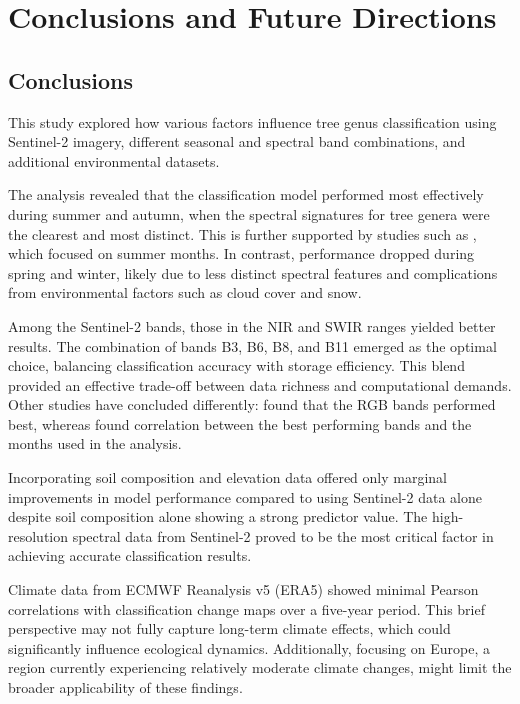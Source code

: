 \chapter{Conclusions and Future Directions}
\label{chapter:conclusion}
\section{Conclusions}


This study explored how various factors influence tree genus classification using Sentinel-2 imagery, different seasonal and spectral band combinations, and additional environmental datasets.

The analysis revealed that the classification model performed most effectively during summer and autumn, when the spectral signatures for tree genera were the clearest and most distinct. This is further supported by studies such as \cite{belgium_classification}, which focused on summer months. In contrast, performance dropped during spring and winter, likely due to less distinct spectral features and complications from environmental factors such as cloud cover and snow.

Among the Sentinel-2 bands, those in the NIR and SWIR ranges yielded better results. The combination of bands B3, B6, B8, and B11 emerged as the optimal choice, balancing classification accuracy with storage efficiency. This blend provided an effective trade-off between data richness and computational demands. Other studies have concluded differently: \cite{Qingyuan} found that the RGB bands performed best, whereas \cite{Yanbiao2021} found correlation between the best performing bands and the months used in the analysis.

Incorporating soil composition and elevation data offered only marginal improvements in model performance compared to using Sentinel-2 data alone despite soil composition alone showing a strong predictor value. The high-resolution spectral data from Sentinel-2 proved to be the most critical factor in achieving accurate classification results.

Climate data from ECMWF Reanalysis v5 (ERA5) showed minimal Pearson correlations with classification change maps over a five-year period. This brief perspective may not fully capture long-term climate effects, which could significantly influence ecological dynamics. Additionally, focusing on Europe, a region currently experiencing relatively moderate climate changes, might limit the broader applicability of these findings.

